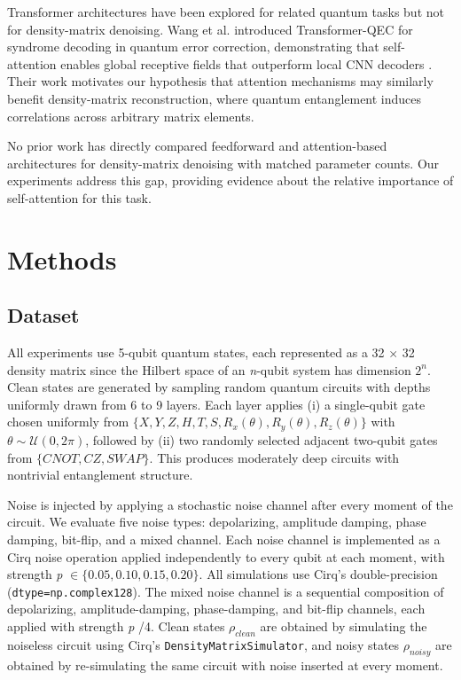 \documentclass[11pt]{article}
\begin{document}
Transformer architectures have been explored for related quantum tasks but not for density-matrix denoising. Wang et al. introduced Transformer-QEC for syndrome decoding in quantum error correction, demonstrating that self-attention enables global receptive fields that outperform local CNN decoders \citep{wang2023transformerqecquantumerrorcorrection}. Their work motivates our hypothesis that attention mechanisms may similarly benefit density-matrix reconstruction, where quantum entanglement induces correlations across arbitrary matrix elements.

No prior work has directly compared feedforward and attention-based architectures for density-matrix denoising with matched parameter counts. Our experiments address this gap, providing evidence about the relative importance of self-attention for this task.
\section{Methods}
\label{sec:org129bcd2}
\subsection{Dataset}
\label{sec:org8cf0906}
All experiments use 5-qubit quantum states, each represented as a 32 \(\times\) 32 density matrix since the Hilbert space of an \emph{n}-qubit system has dimension \(2^n\). Clean states are generated by sampling random quantum circuits with depths uniformly drawn from 6 to 9 layers. Each layer applies (i) a single-qubit gate chosen uniformly from \(\{X, Y, Z, H, T, S, R_x(\theta), R_y(\theta), R_z(\theta)\}\) with \(\theta \sim \mathcal{U}(0, 2\pi)\), followed by (ii) two randomly selected adjacent two-qubit gates from \(\{CNOT, CZ, SWAP\}\). This produces moderately deep circuits with nontrivial entanglement structure.

Noise is injected by applying a stochastic noise channel after every moment of the circuit. We evaluate five noise types: depolarizing, amplitude damping, phase damping, bit-flip, and a mixed channel. Each noise channel is implemented as a Cirq noise operation applied independently to every qubit at each moment, with strength \emph{p} \(\in \{0.05, 0.10, 0.15, 0.20\}\). All simulations use Cirq's double-precision (\texttt{dtype=np.complex128}). The mixed noise channel is a sequential composition of depolarizing, amplitude-damping, phase-damping, and bit-flip channels, each applied with strength \emph{p} /4. Clean states \(\rho_{clean}\) are obtained by simulating the noiseless circuit using Cirq's \texttt{DensityMatrixSimulator}, and noisy states \(\rho_{noisy}\) are obtained by re-simulating the same circuit with noise inserted at every moment.
\end{document}
